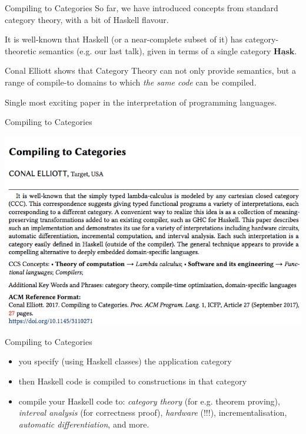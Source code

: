 \documentclass[10pt]{beamer}
\newcommand{\Cat}[1]{\ensuremath{\underline{\mathbf{#1}}}}
\theoremstyle{definition}
\theoremstyle{remark}
\numberwithin{equation}{section}
\begin{document}
\begin{frame}[fragile]{Compiling to Categories}
  So far, we have introduced concepts from standard category theory, with a bit of Haskell flavour.

  It is well-known that Haskell (or a near-complete subset of it) has category-theoretic semantics (e.g. our last talk), given in terms of a single category $\Cat{Hask}$.

  Conal Elliott shows that Category Theory can not only provide semantics, but a range of compile-to domains to which \emph{the same code} can be compiled.

  Single most exciting paper in the interpretation of programming languages.
\end{frame}

\begin{frame}[fragile]{Compiling to Categories}
  \begin{center}
    \includegraphics[width=1.0\textwidth]{compiling-to-categories-headpic.png}
  \end{center}
\end{frame}

\begin{frame}[fragile]{Compiling to Categories}
  \begin{itemize}
    \item you specify (using Haskell classes) the application category
    \item then Haskell code is compiled to constructions in that category
    \item compile your Haskell code to: \emph{category theory} (for e.g. theorem proving), \emph{interval analysis} (for correctness proof), \emph{hardware} (!!!), incrementalisation, \emph{automatic differentiation}, and more.
  \end{itemize}
\end{frame}
\end{document}
